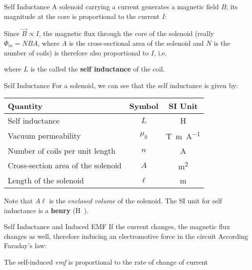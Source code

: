 \documentclass[12pt,aspectratio=169]{beamer}
\begin{document}
\begin{frame}{Self Inductance}
  A solenoid carrying a current generates a magnetic field $B$; its magnitude at
  the core is proportional to the current $I$:


  Since $\vec B\propto I$, the magnetic flux through the core of the solenoid
  (really $\Phi_m=NBA$, where $A$ is the cross-sectional area of the solenoid
  and $N$ is the number of coils) is therefore also proportional to $I$, i.e.


  where $L$ is the called the \textbf{self inductance} of the coil.
\end{frame}



\begin{frame}{Self Inductance}
  For a solenoid, we can see that the self inductance is given by:


  \begin{center}
    \begin{tabular}{l|c|c}
      \rowcolor{pink}
      \textbf{Quantity} & \textbf{Symbol} & \textbf{SI Unit} \\ \hline
      Self inductance & $L$ & \si\henry\\
      Vacuum permeability & $\mu_0$ & \si{\tesla.\metre\per\ampere} \\
      Number of coils per unit length & $n$ & \si\ampere \\
      Cross-section area of the solenoid & $A$ & \si{\metre\squared} \\
      Length of the solenoid & $\ell$ & \si\metre
    \end{tabular}
  \end{center}
  Note that $A\ell$ is the \emph{enclosed volume} of the solenoid. The SI unit
  for self inductance is a \textbf{henry} (\si\henry).
\end{frame}



\begin{frame}{Self Inductance and Induced EMF}
  If the current changes, the magnetic flux changes as well, therefore inducing
  an electromotive force in the circuit According Faraday's law:


  The self-induced \emph{emf} is proportional to the rate of change of current
\end{frame}
\end{document}
